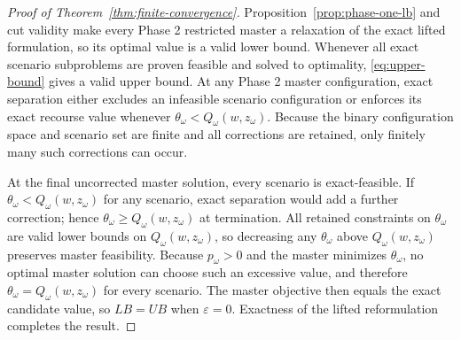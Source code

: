 \begin{proof}[Proof of Theorem~\ref{thm:finite-convergence}]
Proposition~\ref{prop:phase-one-lb} and cut validity make every Phase 2 restricted master a relaxation of the exact lifted formulation, so its optimal value is a valid lower bound.
Whenever all exact scenario subproblems are proven feasible and solved to optimality, \eqref{eq:upper-bound} gives a valid upper bound.
At any Phase 2 master configuration, exact separation either excludes an infeasible scenario configuration or enforces its exact recourse value whenever $\theta_\omega<Q_\omega(w,z_\omega)$.
Because the binary configuration space and scenario set are finite and all corrections are retained, only finitely many such corrections can occur.

At the final uncorrected master solution, every scenario is exact-feasible.
If $\theta_\omega<Q_\omega(w,z_\omega)$ for any scenario, exact separation would add a further correction; hence $\theta_\omega\ge Q_\omega(w,z_\omega)$ at termination.
All retained constraints on $\theta_\omega$ are valid lower bounds on $Q_\omega(w,z_\omega)$, so decreasing any $\theta_\omega$ above $Q_\omega(w,z_\omega)$ preserves master feasibility.
Because $p_\omega>0$ and the master minimizes $\theta_\omega$, no optimal master solution can choose such an excessive value, and therefore $\theta_\omega=Q_\omega(w,z_\omega)$ for every scenario.
The master objective then equals the exact candidate value, so $LB=UB$ when $\varepsilon=0$.
Exactness of the lifted reformulation completes the result.
\end{proof}
